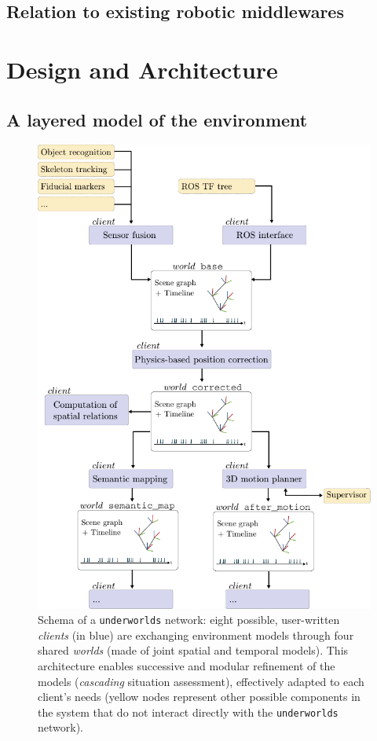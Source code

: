 \documentclass[letterpaper, 10 pt, conference]{ieeeconf}  %
\newcommand{\uwds}{{\tt underworlds}\xspace}
\begin{document}
\subsection{Relation to existing robotic middlewares}

\section{Design and Architecture}

\subsection{A layered model of the environment}

\begin{figure}
    \centering
    \includegraphics[width=\linewidth]{overview}
    \caption{Schema of a \uwds network: eight possible, user-written
    \emph{clients} (in blue) are exchanging environment models through four shared
    \emph{worlds} (made of joint spatial and temporal models). This architecture
    enables successive and modular refinement of the models
    (\emph{cascading} situation assessment), effectively adapted to each
    client's needs (yellow nodes represent other possible components in the system that do not
interact directly with the \uwds network).} \label{fig|scene} \end{figure}
\end{document}

